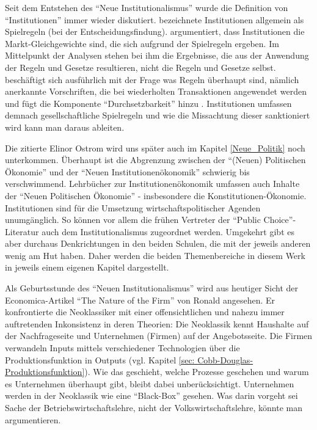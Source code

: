 Seit dem Entstehen des "`Neue Institutionalismus"' wurde die Definition von "`Institutionen"' immer wieder diskutiert. \textcite[S. 4]{Riker1980} bezeichnete Institutionen allgemein als Spielregeln (bei der Entscheidungsfindung). \textcite{Schotter1981} argumentiert, dass Institutionen die Markt-Gleichgewichte sind, die sich aufgrund der Spielregeln ergeben. Im Mittelpunkt der Analysen stehen bei ihm die Ergebnisse, die aus der Anwendung der Regeln und Gesetze resultieren, nicht die Regeln und Gesetze selbst. \textcite{Ostrom1986} beschäftigt sich ausführlich mit der Frage was Regeln überhaupt sind, nämlich anerkannte Vorschriften, die bei wiederholten Transaktionen angewendet werden \parencite[S. 5]{Ostrom1986} und fügt die Komponente "`Durchsetzbarkeit"' hinzu \parencite[S. 6]{Ostrom1986}. Institutionen umfassen demnach gesellschaftliche Spielregeln und wie die Missachtung dieser sanktioniert wird \parencite[S. 26]{Voigt2009} kann man daraus ableiten.

Die zitierte Elinor Ostrom wird uns später auch im Kapitel \ref{Neue_Politik} noch unterkommen. Überhaupt ist die Abgrenzung zwischen der "`(Neuen) Politischen Ökonomie"' und der "`Neuen Institutionenökonomik"' schwierig bis verschwimmend. Lehrbücher zur Institutionenökonomik \parencite{Erlei2016, Voigt2009} umfassen auch Inhalte der "`Neuen Politischen Ökonomie"' - insbesondere die Konstitutionen-Ökonomie. Institutionen sind für die Umsetzung wirtschaftspolitischer Agenden unumgänglich. So können vor allem die frühen Vertreter der "`Public Choice"'-Literatur auch dem Institutionalismus zugeordnet werden. Umgekehrt gibt es aber durchaus Denkrichtungen in den beiden Schulen, die mit der jeweils anderen wenig am Hut haben. Daher werden die beiden Themenbereiche in diesem Werk in jeweils einem eigenen Kapitel dargestellt.

Als Geburtsstunde des "`Neuen Institutionalismus"' wird aus heutiger Sicht der Economica-Artikel "`The Nature of the Firm"' von Ronald \textcite{Coase1937} angesehen. Er konfrontierte die Neoklassiker mit einer offensichtlichen und nahezu immer auftretenden Inkonsistenz in deren Theorien: Die Neoklassik kennt Haushalte auf der Nachfrageseite und Unternehmen (Firmen) auf der Angebotsseite. Die Firmen verwandeln Inputs mittels verschiedener Technologien über die Produktionsfunktion in Outputs (vgl. Kapitel \ref{sec: Cobb-Douglas-Produktionsfunktion}). Wie das geschieht, welche Prozesse geschehen und warum es Unternehmen überhaupt gibt, bleibt dabei unberücksichtigt. Unternehmen werden in der Neoklassik wie eine "`Black-Box"' gesehen. Was darin vorgeht sei Sache der Betriebswirtschaftslehre, nicht der Volkswirtschaftslehre, könnte man argumentieren.

